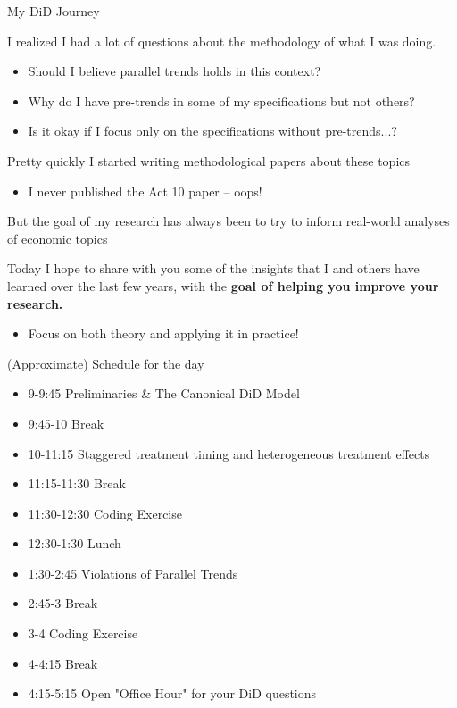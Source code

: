 \documentclass[aspectratio = 169, 12pt]{beamer}
\begin{document}
\begin{frame}{My DiD Journey}
  \begin{wideitemize}
    \item
    I realized I had a lot of questions about the methodology of what I was doing.
    \begin{itemize}
      \item
            Should I believe parallel trends holds in this context?

      \item
            Why do I have pre-trends in some of my specifications but not others?

      \item
            Is it okay if I focus only on the specifications without pre-trends...?
    \end{itemize}

    \pause
    \item Pretty quickly I started writing methodological papers about these topics
    \begin{itemize}
      \item
            I never published the Act 10 paper -- oops!
    \end{itemize}

    \item But the goal of my research has always been to try to inform real-world analyses of economic topics

    \pause
    \item Today I hope to share with you some of the insights that I and others have learned over the last few years, with the \textbf{goal of helping you improve your research.}
    \begin{itemize}
      \item
            Focus on both theory and applying it in practice!
    \end{itemize}

  \end{wideitemize}
\end{frame}


\begin{frame}{(Approximate) Schedule for the day}
\begin{itemize}
	\item 9-9:45 Preliminaries \& The Canonical DiD Model
	\item 9:45-10 Break
	\item 10-11:15 Staggered treatment timing and heterogeneous treatment effects
	\item 11:15-11:30 Break
	\item 11:30-12:30 Coding Exercise
	\item 12:30-1:30 Lunch
	\item 1:30-2:45 Violations of Parallel Trends
	\item 2:45-3 Break
	\item 3-4 Coding Exercise
	\item 4-4:15 Break
	\item 4:15-5:15 Open "Office Hour" for your DiD questions
\end{itemize}
\end{frame}
\end{document}
